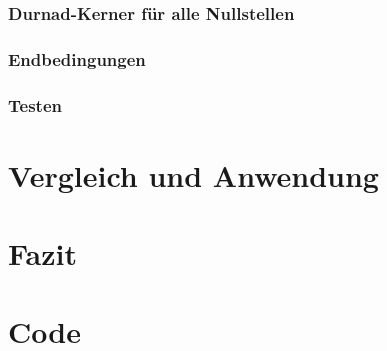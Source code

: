 \documentclass[12pt]{article}
\begin{document}
    \subsubsection{Durnad-Kerner für alle Nullstellen}
    \subsubsection{Endbedingungen}
    \subsubsection{Testen}

\section{Vergleich und Anwendung}

\section{Fazit}

\section{Code}
\end{document}
